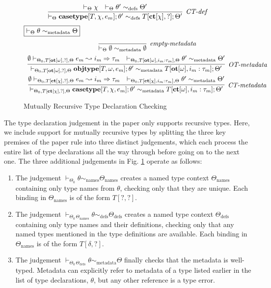 \begin{figure}[h]
\[\begin{array}{c}
\infer[\textit{CT-def}]
  {\vdash_{\Theta} \keyw{casetype}[T,\chi,e_m];\theta' \sim_{\text{defs}} T[\keyw{ct}[\chi], ?]; \Theta'}
  { \vdash_\Theta \chi
  & \vdash _\Theta \theta' \sim_{\text{defs}} \Theta'}
\end{array}
\]
$\fbox{$\vdash_\Theta \theta \sim_{\text{metadata}} \Theta$}$
\[
\begin{array}{c}
\infer[\textit{empty-metadata}]
  {\vdash_{\Theta} \emptyset \sim_{\text{metadata}} \emptyset}
  { }\\[1ex]
\infer[\textit{OT-metadata}]
  {\vdash_{\Theta_0, T[\keyw{ot}[\omega],?], \Theta} \keyw{objtype}[T, \omega, e_m]; \theta' \sim_{\text{metadata}} T[\keyw{ot}[\omega],i_m:\tau_m]; \Theta'}
  { \emptyset \vdash_{\Theta_0, T[\keyw{ot}[\omega], ?], \Theta} e_m \leadsto i_m \Rightarrow \tau_m
  & \vdash_{\Theta_0, T[\keyw{ot}[\omega], i_m : \tau_m], \Theta} \theta' \sim_{\text{metadata}} \Theta'}\\[1ex]

\infer[\textit{CT-metadata}]
  {\vdash_{\Theta_0, T[\keyw{ct}[\chi],?], \Theta} \keyw{casetype}[T, \chi, e_m]; \theta' \sim_{\text{metadata}} T[\keyw{ct}[\omega],i_m:\tau_m]; \Theta'}
  { \emptyset \vdash_{\Theta_0, T[\keyw{ct}[\chi], ?], \Theta} e_m \leadsto i_m \Rightarrow \tau_m
  & \vdash_{\Theta_0, T[\keyw{ct}[\chi], i_m : \tau_m], \Theta} \theta' \sim_{\text{metadata}} \Theta'}
\end{array}
\]
\caption{Mutually Recursive Type Declaration Checking}
\label{fig:mutual-recursion}
\end{figure}


The type declaration judgement in the paper only supports recursive types. Here, we include support for mutually recursive types by splitting the three key premises of the paper rule into three distinct judgements, which each process the entire list of type declarations all the way through before going on to the next one. The three additional judgements in Fig. \ref{fig:mutual-recursion} operate as follows:
\begin{enumerate}
\item The judgement $\vdash_{\Theta_0} \theta \sim_{\text{names}} \Theta_{\text{names}}$ creates a named type context $\Theta_{\text{names}}$ containing only type names from $\theta$, checking only that they are unique. Each binding in $\Theta_{\text{names}}$ is of the form $T[?, ?]$.
\item The judgement $\vdash_{\Theta_{0}\,\Theta_{\text{names}}} \theta \sim_{\text{defs}} \Theta_{\text{defs}}$ creates a named type context $\Theta_{\text{defs}}$ containing only type names and their definitions, checking only that any named types mentioned in the type definitions are available. Each binding in $\Theta_{\text{names}}$ is of the form $T[\delta, ?]$.
\item The judgement $\vdash_{\Theta_{0}\,\Theta_{\text{defs}}} \theta \sim_{\text{metadata}} \Theta$ finally checks that the metadata is well-typed. Metadata can explicitly refer to metadata of a type listed earlier in the list of type declarations, $\theta$, but any other reference is a type error.
\end{enumerate}

